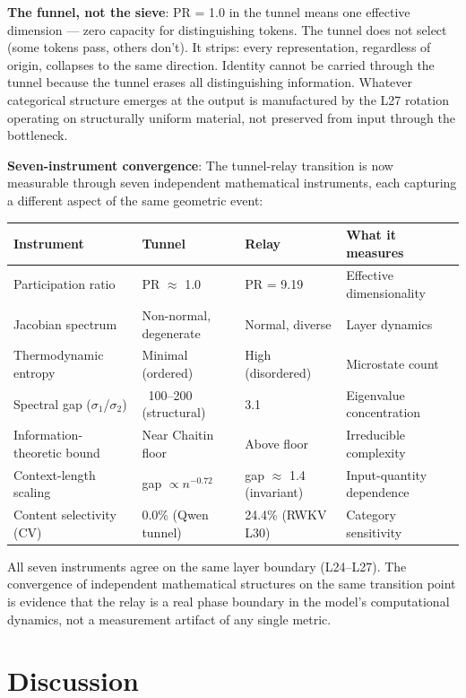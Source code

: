 \documentclass[11pt]{article}
\begin{document}
\textbf{The funnel, not the sieve}: PR = 1.0 in the tunnel means one effective dimension --- zero capacity for distinguishing tokens. The tunnel does not select (some tokens pass, others don't). It strips: every representation, regardless of origin, collapses to the same direction. Identity cannot be carried through the tunnel because the tunnel erases all distinguishing information. Whatever categorical structure emerges at the output is manufactured by the L27 rotation operating on structurally uniform material, not preserved from input through the bottleneck.

\textbf{Seven-instrument convergence}: The tunnel-relay transition is now measurable through seven independent mathematical instruments, each capturing a different aspect of the same geometric event:

\begin{table}[h]
\centering
\small
\begin{tabular}{|l|l|l|l|}
\hline
\textbf{Instrument} & \textbf{Tunnel} & \textbf{Relay} & \textbf{What it measures} \\
\hline
Participation ratio & PR $\approx$ 1.0 & PR = 9.19 & Effective dimensionality \\
Jacobian spectrum & Non-normal, degenerate & Normal, diverse & Layer dynamics \\
Thermodynamic entropy & Minimal (ordered) & High (disordered) & Microstate count \\
Spectral gap ($\sigma$$_1$/$\sigma$$_2$) & ~100–200 (structural) & 3.1 & Eigenvalue concentration \\
Information-theoretic bound & Near Chaitin floor & Above floor & Irreducible complexity \\
Context-length scaling & gap $\propto n^{-0.72}$ & gap $\approx$ 1.4 (invariant) & Input-quantity dependence \\
Content selectivity (CV) & 0.0\% (Qwen tunnel) & 24.4\% (RWKV L30) & Category sensitivity \\
\hline
\end{tabular}
\end{table}

All seven instruments agree on the same layer boundary (L24–L27). The convergence of independent mathematical structures on the same transition point is evidence that the relay is a real phase boundary in the model's computational dynamics, not a measurement artifact of any single metric.

\section{Discussion}
\end{document}

